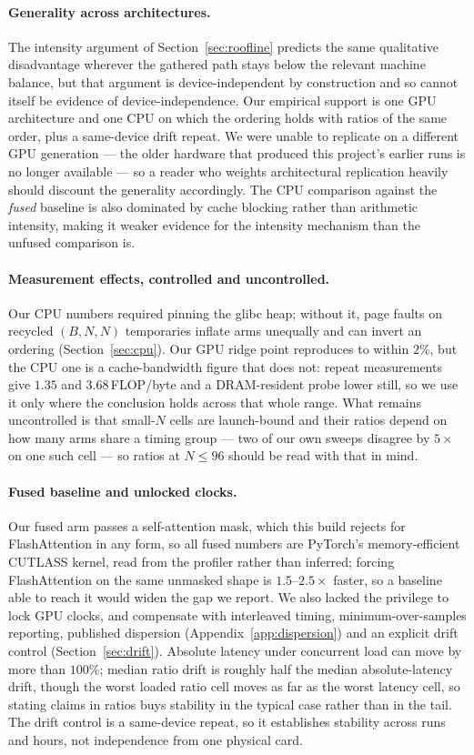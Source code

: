 \paragraph{Generality across architectures.} The intensity argument of
Section~\ref{sec:roofline} predicts the same qualitative disadvantage wherever
the gathered path stays below the relevant machine balance, but that argument
is device-independent by construction and so cannot itself be evidence of
device-independence. Our empirical support is one GPU architecture and one CPU
on which the ordering holds with ratios of the same order, plus a same-device
drift repeat. We were unable to replicate on a different GPU generation --- the
older hardware that produced this project's earlier runs is no longer available
--- so a reader who weights architectural replication heavily should discount
the generality accordingly. The CPU comparison against the \emph{fused}
baseline is also dominated by cache blocking rather than arithmetic intensity,
making it weaker evidence for the intensity mechanism than the unfused
comparison is.

\paragraph{Measurement effects, controlled and uncontrolled.} Our CPU numbers
required pinning the glibc heap; without it, page faults on recycled $(B,N,N)$
temporaries inflate arms unequally and can invert an ordering
(Section~\ref{sec:cpu}). Our GPU ridge point reproduces to within $2\%$, but
the CPU one is a cache-bandwidth figure that does not: repeat measurements give
$1.35$ and $3.68$\,FLOP/byte and a DRAM-resident probe lower still, so we use
it only where the conclusion holds across that whole range. What remains
uncontrolled is that small-$N$ cells are launch-bound and their ratios depend
on how many arms share a timing group --- two of our own sweeps disagree by
$5\times$ on one such cell --- so ratios at $N \le 96$ should be read with that
in mind.

\paragraph{Fused baseline and unlocked clocks.} Our fused arm passes a
self-attention mask, which this build rejects for FlashAttention in any form,
so all fused numbers are PyTorch's memory-efficient CUTLASS kernel, read from
the profiler rather than inferred; forcing FlashAttention on the same unmasked
shape is $1.5$--$2.5\times$ faster, so a baseline able to reach it would widen
the gap we report. We also lacked the privilege to lock GPU clocks, and
compensate with interleaved timing, minimum-over-samples reporting, published
dispersion (Appendix~\ref{app:dispersion}) and an explicit drift control
(Section~\ref{sec:drift}). Absolute latency under concurrent load can move by
more than $100\%$; median ratio drift is roughly half the median
absolute-latency drift, though the worst loaded ratio cell moves as far as the
worst latency cell, so stating claims in ratios buys stability in the typical
case rather than in the tail. The drift control is a same-device repeat, so it
establishes stability across runs and hours, not independence from one physical
card.

